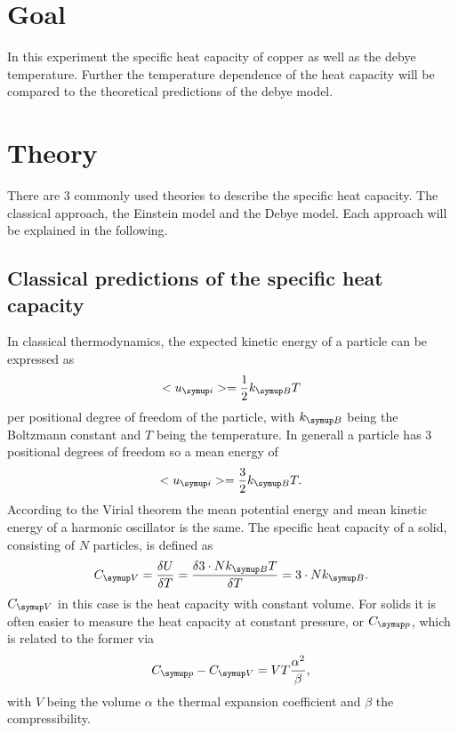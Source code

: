 \section{Goal}
In this experiment the specific heat capacity of copper as well as the debye temperature. Further the temperature dependence of the 
heat capacity will be compared to the theoretical predictions of the debye model.
\section{Theory}
There are 3 commonly used theories to describe the specific heat capacity. The classical approach, the Einstein model and the Debye model.
Each approach will be explained in the following.
\subsection{Classical predictions of the specific heat capacity}
In classical thermodynamics, the expected kinetic energy of a particle can be expressed as 
\begin{equation*}
    <u\idx{i}> = \frac{1}{2}k\idx{B}T
\end{equation*}
per positional degree of freedom of the particle, with $k\idx{B}$ being the Boltzmann constant and $T$ being the temperature. In generall
a particle has 3 positional degrees of freedom so a mean energy of 
\begin{equation*}
    <u\idx{i}> = \frac{3}{2}k\idx{B}T.
\end{equation*}
According to the Virial theorem the mean potential energy and mean kinetic energy of a harmonic oscillator is the same. The specific heat 
capacity of a solid, consisting of $N$ particles, is defined as
\begin{equation*}
    C\idx{V} = \frac{\delta U}{\delta T} = \frac{\delta 3\cdot Nk\idx{B}T}{\delta T} = 3\cdot Nk\idx{B}.
\end{equation*}
$C\idx{V}$ in this case is the heat capacity with constant volume. For solids it is often easier to measure the heat capacity at 
constant pressure, or $C\idx{p}$, which is related to the former via
\begin{equation}
    C\idx{p}-C\idx{V} = VT\frac{\alpha^2}{\beta},
    \label{eq:CpCV}
\end{equation}
with $V$ being the volume $\alpha$ the thermal expansion coefficient and $\beta$ the compressibility.
